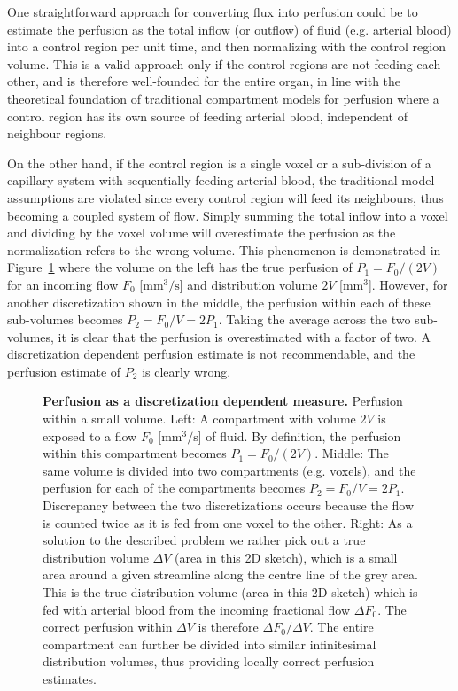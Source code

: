 \documentclass[10pt]{article}
\begin{document}
	One straightforward approach for converting flux into perfusion could be to estimate the perfusion as the total inflow (or outflow) of fluid (e.g. arterial blood) into a control region per unit time, and then normalizing with the control region volume. 
	This is a valid approach only if the control regions are not feeding each other, and is therefore well-founded for the entire organ,
	in line with the theoretical foundation of traditional compartment models for perfusion where a control region has its own source of feeding arterial blood, independent of neighbour regions. 

	On the other hand, if the control region is a single voxel or a sub-division of a capillary system with sequentially feeding arterial blood, the traditional model assumptions are violated since every control region will feed its neighbours, thus becoming a coupled system of flow. 
	Simply summing the total inflow into a voxel and dividing by the voxel volume will overestimate the perfusion as the normalization refers to the wrong volume. 
	This phenomenon is demonstrated in Figure~\ref{fig:perfusion-problem} where the volume on the left has the true perfusion of $P_{1} = F_0 /(2V)$ for an incoming flow $F_0$ [$\si{\milli\meter\cubed\per\second}$] and distribution volume $2V$ [$\si{\milli\meter\cubed}$]. 
	However, for another discretization shown in the middle, the perfusion within each of these sub-volumes becomes $P_{2} = F_0/V = 2P_{1}$. 
	Taking the average across the two sub-volumes, it is clear that the perfusion is overestimated with a factor of two. 
	A discretization dependent perfusion estimate is not recommendable, and the perfusion estimate of $P_{2}$ is clearly wrong. 

\begin{figure}[!h]
\caption{{\bf Perfusion as a discretization dependent measure.}
Perfusion within a small volume. Left: A compartment with volume $2V$ is exposed to a flow $F_0$ [$\si{\milli\meter\cubed\per\second}$] of fluid. By definition, the perfusion within this compartment becomes $P_{1} = F_0/(2V)$. Middle: The same volume is divided into two compartments (e.g. voxels), and the perfusion for each of the compartments becomes $P_{2} = F_0/V = 2P_{1}$. Discrepancy between the two discretizations occurs because the flow is counted twice as it is fed from one voxel to the other. Right: As a solution to the described problem we rather pick out a true distribution volume $\Delta V$ (area in this 2D sketch), which is a small area around a given streamline along the centre line of the grey area. This is the true distribution volume (area in this 2D sketch) which is fed with arterial blood from the incoming fractional flow $\Delta F_0$. The correct perfusion within $\Delta V$ is therefore $\Delta F_0/\Delta V$. The entire compartment can further be divided into similar infinitesimal distribution volumes, thus providing locally correct perfusion estimates.}
\label{fig:perfusion-problem}
\end{figure}
\end{document}
